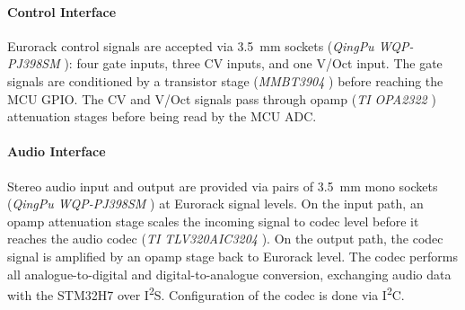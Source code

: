 \paragraph{Control Interface}
Eurorack control signals are accepted via \qty{3.5}{mm} sockets (\textit{QingPu WQP-PJ398SM} \cite{35mmJackVertical}): 
four gate inputs, three CV inputs, and one V/Oct input. 
The gate signals are conditioned by a transistor stage (\textit{MMBT3904} \cite{2N3904MMBT3904PZT39042002a}) before reaching the MCU GPIO. 
The CV and V/Oct signals pass through opamp (\textit{TI OPA2322} \cite{Opa2322}) attenuation stages before being read by the MCU ADC.

\paragraph{Audio Interface}
Stereo audio input and output are provided via pairs of \qty{3.5}{mm} mono sockets (\textit{QingPu WQP-PJ398SM} \cite{35mmJackVertical}) at Eurorack signal levels. 
On the input path, an opamp attenuation stage scales the incoming signal to codec level before it reaches the audio codec (\textit{TI TLV320AIC3204} \cite{texasinstrumentsTlv320aic3204Datasheet}). 
On the output path, the codec signal is amplified by an opamp stage back to Eurorack level. 
The codec performs all analogue-to-digital and digital-to-analogue conversion, 
exchanging audio data with the STM32H7 over I\textsuperscript{2}S.
Configuration of the codec is done via I\textsuperscript{2}C.

